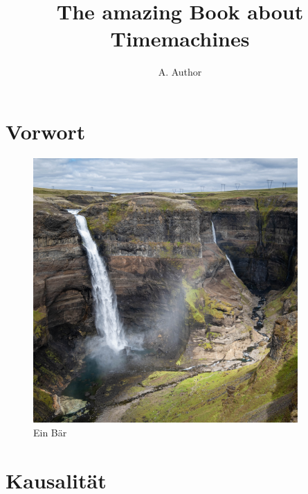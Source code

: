 \documentclass[
a5paper,
10pt, 
onecolumn,
openany,
]{memoir}
\author{\sffamily\huge A. Author}
\title{\sffamily\Huge The amazing Book about Timemachines}
\date{}
\begin{document}
\frontmatter

\maketitle

\clearpage

\tableofcontents*

\clearpage

\chapter{Vorwort}

\lipsum[1-2]

\begin{figure}
  \centering
  \includegraphics[width=0.9\textwidth]{fotos/a}
  \caption{Ein Bär}
\end{figure}

\lipsum[1-2]

\mainmatter





\clearpage
 
\thispagestyle{empty}
\listoffigures
\clearpage

\thispagestyle{empty}
\listoftables
\clearpage

\appendix

\chapter{Kausalität}

\lipsum[1-2]

\backmatter
\end{document}
